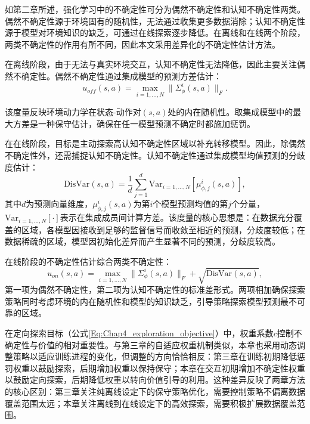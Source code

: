 如第二章所述，强化学习中的不确定性可分为偶然不确定性和认知不确定性两类。偶然不确定性源于环境固有的随机性，无法通过收集更多数据消除；认知不确定性源于模型对环境知识的缺乏，可通过在线探索逐步降低。在离线和在线两个阶段，两类不确定性的作用有所不同，因此本文采用差异化的不确定性估计方法。

在离线阶段，由于无法与真实环境交互，认知不确定性无法降低，因此主要关注偶然不确定性。偶然不确定性通过集成模型的预测方差估计：
\begin{equation}\label{Eq:Chap4_aleatoric_uncertainty}
  u_{off}(s, a) = \max_{i=1,\ldots,N} \|\Sigma_\phi^i(s, a)\|_F.
\end{equation}

该度量反映环境动力学在状态-动作对$(s,a)$处的内在随机性。取集成模型中的最大方差是一种保守估计，确保在任一模型预测不确定时都施加惩罚。

在在线阶段，目标是主动探索高认知不确定性区域以补充转移模型。因此，除偶然不确定性外，还需捕捉认知不确定性。认知不确定性通过集成模型均值预测的分歧度估计：
\begin{equation}\label{Eq:Chap4_epistemic_uncertainty}
  \text{DisVar}(s, a) = \frac{1}{d}\sum_{j=1}^{d} \text{Var}_{i=1,\ldots,N}[\mu_{\phi,j}^i(s, a)],
\end{equation}
其中$d$为预测向量维度，$\mu_{\phi,j}^i(s, a)$为第$i$个模型预测均值的第$j$个分量，$\text{Var}_{i=1,\ldots,N}[\cdot]$表示在集成成员间计算方差。该度量的核心思想是：在数据充分覆盖的区域，各模型因接收到足够的监督信号而收敛至相近的预测，分歧度较低；在数据稀疏的区域，模型因初始化差异而产生显著不同的预测，分歧度较高。

在线阶段的不确定性估计综合两类不确定性：
\begin{equation}\label{Eq:Chap4_online_uncertainty}
  u_{on}(s, a) = \max_{i=1,\ldots,N} \|\Sigma_\phi^i(s, a)\|_F + \sqrt{\text{DisVar}(s, a)},
\end{equation}
第一项为偶然不确定性，第二项为认知不确定性的标准差形式。两项相加确保探索策略同时考虑环境的内在随机性和模型的知识缺乏，引导策略探索模型预测最不可靠的区域。


在定向探索目标（公式\ref{Eq:Chap4_exploration_objective}）中，权重系数$c$控制不确定性与价值的相对重要性。与第三章的自适应权重机制类似，本章也采用动态调整策略以适应训练进程的变化，但调整的方向恰恰相反：第三章在训练初期降低惩罚权重以鼓励探索，后期增加权重以保持保守；本章在交互初期增加不确定性权重以鼓励定向探索，后期降低权重以转向价值引导的利用。这种差异反映了两章方法的核心区别：第三章关注纯离线设定下的保守策略优化，需要控制策略不偏离数据覆盖范围太远；本章关注离线到在线设定下的高效探索，需要积极扩展数据覆盖范围。

